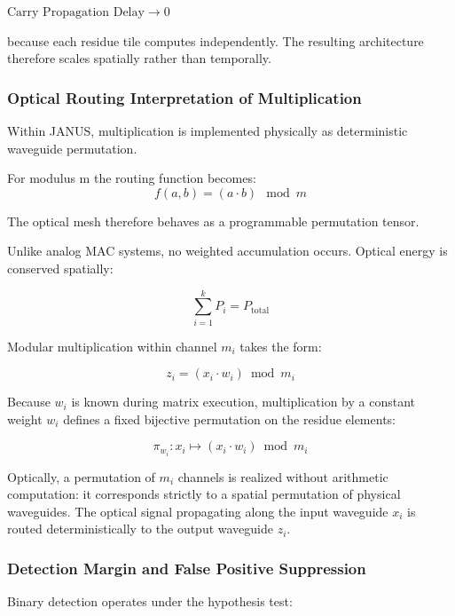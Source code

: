 \documentclass[journal]{IEEEtran}
\begin{document}
$\text{Carry Propagation Delay} \to 0$

because each residue tile computes independently.
The resulting architecture therefore scales spatially rather than temporally.

\subsubsection{\textbf{Optical Routing Interpretation of Multiplication}}
Within JANUS, multiplication is implemented physically as deterministic waveguide permutation.

For modulus m the routing function becomes:
\begin{equation}
f (a, b) = (a \cdot b) \mod m
\end{equation}

The optical mesh therefore behaves as a programmable permutation tensor.

Unlike analog MAC systems, no weighted accumulation occurs. Optical energy is conserved spatially:

\begin{equation}
\sum_{i=1}^k P_i = P_{\mathrm{total}}
\end{equation}

Modular multiplication within channel $m_i$ takes the form:

\begin{equation}
z_i = (x_i \cdot w_i) \bmod m_i
\end{equation}

Because $w_i$ is known during matrix execution, multiplication by a constant weight $w_i$ defines a fixed bijective permutation on the residue elements:

\begin{equation}
\pi_{w_i}: x_i \mapsto (x_i \cdot w_i) \bmod m_i
\end{equation}

Optically, a permutation of $m_i$ channels is realized without arithmetic computation: it corresponds strictly to a spatial permutation of physical waveguides. The optical signal propagating along the input waveguide $x_i$ is routed deterministically to the output waveguide $z_i$.

\subsubsection{\textbf{Detection Margin and False Positive Suppression}}

Binary detection operates under the hypothesis test:
\end{document}
